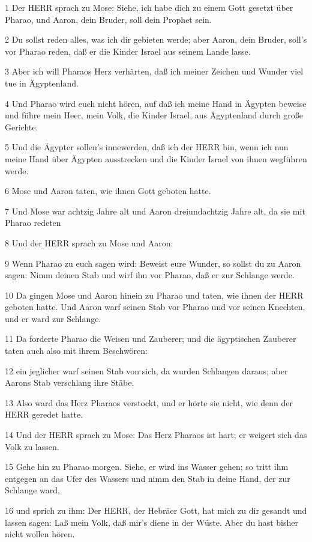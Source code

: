 \par 1 Der HERR sprach zu Mose: Siehe, ich habe dich zu einem Gott gesetzt über Pharao, und Aaron, dein Bruder, soll dein Prophet sein.
\par 2 Du sollst reden alles, was ich dir gebieten werde; aber Aaron, dein Bruder, soll's vor Pharao reden, daß er die Kinder Israel aus seinem Lande lasse.
\par 3 Aber ich will Pharaos Herz verhärten, daß ich meiner Zeichen und Wunder viel tue in Ägyptenland.
\par 4 Und Pharao wird euch nicht hören, auf daß ich meine Hand in Ägypten beweise und führe mein Heer, mein Volk, die Kinder Israel, aus Ägyptenland durch große Gerichte.
\par 5 Und die Ägypter sollen's innewerden, daß ich der HERR bin, wenn ich nun meine Hand über Ägypten ausstrecken und die Kinder Israel von ihnen wegführen werde.
\par 6 Mose und Aaron taten, wie ihnen Gott geboten hatte.
\par 7 Und Mose war achtzig Jahre alt und Aaron dreiundachtzig Jahre alt, da sie mit Pharao redeten
\par 8 Und der HERR sprach zu Mose und Aaron:
\par 9 Wenn Pharao zu euch sagen wird: Beweist eure Wunder, so sollst du zu Aaron sagen: Nimm deinen Stab und wirf ihn vor Pharao, daß er zur Schlange werde.
\par 10 Da gingen Mose und Aaron hinein zu Pharao und taten, wie ihnen der HERR geboten hatte. Und Aaron warf seinen Stab vor Pharao und vor seinen Knechten, und er ward zur Schlange.
\par 11 Da forderte Pharao die Weisen und Zauberer; und die ägyptischen Zauberer taten auch also mit ihrem Beschwören:
\par 12 ein jeglicher warf seinen Stab von sich, da wurden Schlangen daraus; aber Aarons Stab verschlang ihre Stäbe.
\par 13 Also ward das Herz Pharaos verstockt, und er hörte sie nicht, wie denn der HERR geredet hatte.
\par 14 Und der HERR sprach zu Mose: Das Herz Pharaos ist hart; er weigert sich das Volk zu lassen.
\par 15 Gehe hin zu Pharao morgen. Siehe, er wird ins Wasser gehen; so tritt ihm entgegen an das Ufer des Wassers und nimm den Stab in deine Hand, der zur Schlange ward,
\par 16 und sprich zu ihm: Der HERR, der Hebräer Gott, hat mich zu dir gesandt und lassen sagen: Laß mein Volk, daß mir's diene in der Wüste. Aber du hast bisher nicht wollen hören.
